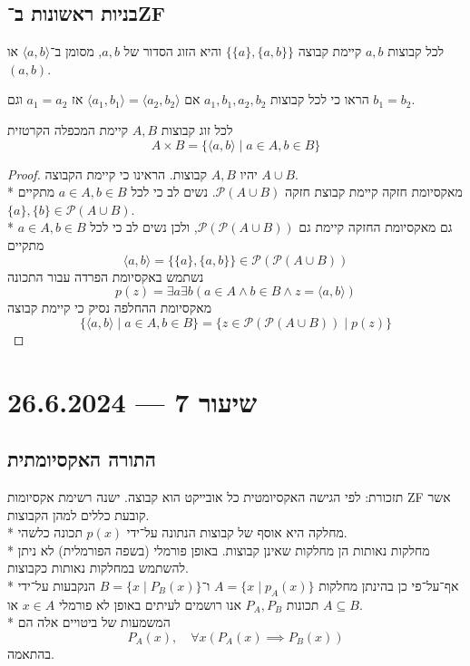 \subsection{בניות ראשונות ב־ZF}
\begin{proposition}
	לכל קבוצות $a, b$ קיימת קבוצה $\{ \{a\}, \{a, b\}\}$ והיא הזוג הסדור של $a, b$, מסומן ב־$\langle a, b \rangle$ או $(a, b)$.
\end{proposition}
\begin{exercise}
	הראו כי לכל קבוצות $a_1, b_1, a_2, b_2$ אם $\langle a_1, b_1 \rangle = \langle a_2, b_2 \rangle$ אז $a_1 = a_2$ וגם $b_1 = b_2$.
\end{exercise}
\begin{proposition}
	לכל זוג קבוצות $A, B$ קיימת המכפלה הקרטזית
	\[
		A \times B = \{ \langle a, b \rangle \mid a \in A, b \in B \}
	\]
\end{proposition}
\begin{proof}
	יהיו $A, B$ קבוצות. הראינו כי קיימת הקבוצה $A \cup B$. \\*
	מאקסיומת חזקה קיימת קבוצת חזקה $\mathcal{P}(A \cup B)$. 
	נשים לב כי לכל $a \in A, b \in B$ מתקיים $\{a\}, \{b\} \in \mathcal{P}(A \cup B)$. \\*
	גם מאקסיומת החזקה קיימת גם $\mathcal{P}(\mathcal{P}(A \cup B))$, ולכן נשים לב כי לכל $a \in A, b \in B$ מתקיים
	\[
		\langle a, b \rangle = \{\{a\}, \{a, b\}\} \in \mathcal{P}(\mathcal{P}(A \cup B))
	\]
	נשתמש באקסיומת הפרדה עבור התכונה
	\[
		p(z) = \exists a \exists b (a \in A \land b \in B \land z = \langle a, b \rangle)
	\]
	מאקסיומת ההחלפה נסיק כי קיימת קבוצה
	\[
		\{ \langle a, b \rangle \mid a \in A, b \in B \} = \{ z \in \mathcal{P}(\mathcal{P}(A \cup B)) \mid p(z) \}
	\]
\end{proof}

\section{שיעור 7 --- 26.6.2024}
\subsection{התורה האקסיומתית}
תזכורת: לפי הגישה האקסיומטית כל אובייקט הוא קבוצה. ישנה רשימת אקסיומות ZF אשר קובעת כללים למהן הקבוצות. \\*
מחלקה היא אוסף של קבוצות הנתונה על־ידי $p(x)$ תכונה כלשהי. \\*
מחלקות נאותות הן מחלקות שאינן קבוצות. באופן פורמלי (בשפה הפורמלית) לא ניתן להשתמש במחלקות נאותות כקבוצות. \\*
אף־על־פי כן בהינתן מחלקות $A = \{ x \mid p_A(x) \}$ ו־$B = \{ x \mid P_B(x) \}$ הנקבעות על־ידי תכונות $P_A, P_B$ אנו רושמים לעיתים באופן לא פורמלי $x \in A$ או $A \subseteq B$. \\*
המשמעות של ביטויים אלה הם
\[
	P_A(x),
	\quad
	\forall x (P_A(x) \implies P_B(x))
\]
בהתאמה.

